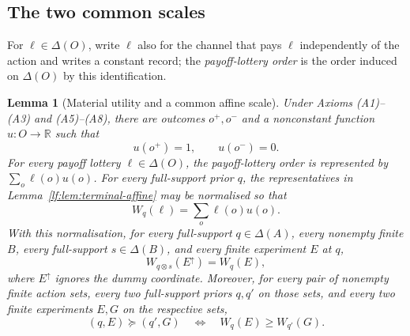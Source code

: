 \documentclass[11pt,a4paper]{article}
\newtheorem{lemma}[theorem]{Lemma}
\theoremstyle{definition}
\newcommand{\D}{\Delta}
\newcommand{\R}{\mathbb R}
\newcommand{\1}{\mathbf 1}
\begin{document}
\subsection{The two common scales}

For $\ell\in\D(O)$, write $\ell$ also for the channel that pays $\ell$
independently of the action and writes a constant record; the
\emph{payoff-lottery order} is the order induced on $\D(O)$ by this
identification.

\begin{lemma}[Material utility and a common affine scale]\label{lf:lem:material-scale}
Under Axioms \textup{(A1)--(A3)} and
\textup{(A5)--(A8)}, there are outcomes $o^+,o^-$ and a
nonconstant function $u:O\to\R$ such that
\[
u(o^+)=1,
\qquad
u(o^-)=0.
\]
For every payoff lottery $\ell\in\D(O)$, the payoff-lottery order is represented
by $\sum_o\ell(o)u(o)$.  For every full-support prior $q$, the representatives
in Lemma~\ref{lf:lem:terminal-affine} may be normalised so that
\begin{equation}
W_q(\ell)=\sum_o\ell(o)u(o).
\label{lf:eq:payoff-normalisation}
\end{equation}
With this normalisation, for every full-support $q\in\D(A)$, every nonempty
finite $B$, every full-support $s\in\D(B)$, and every finite experiment $E$ at
$q$,
\[
W_{q\otimes s}(E^\uparrow)=W_q(E),
\]
where $E^\uparrow$ ignores the dummy coordinate.  Moreover, for every pair of nonempty
finite action sets, every two full-support priors $q,q'$ on those sets, and
every two finite experiments $E,G$ on the respective sets,
\begin{equation}
(q,E)\succeq(q',G)
\quad\Longleftrightarrow\quad
W_q(E)\ge W_{q'}(G).
\label{lf:eq:common-scale}
\end{equation}
\end{lemma}
\end{document}
